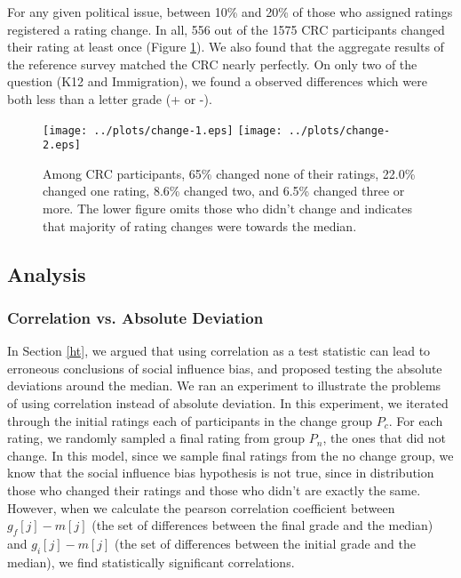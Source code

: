 For any given political issue, between 10\% and 20\% of those who assigned ratings registered a rating change.
In all, 556 out of the 1575 CRC participants changed their rating at least once (Figure \ref{change-1}).
We also found that the aggregate results of the reference survey matched the CRC nearly perfectly.
On only two of the question (K12 and Immigration), we found a observed differences which were both less than a letter grade (+ or -).

\begin{figure}[h]
\hspace*{-2em}
    \texttt{[image: ../plots/change-1.eps]}
    \hspace*{-2em}
    \texttt{[image: ../plots/change-2.eps]}
      \caption{Among CRC participants, 65\% changed none of their ratings, 22.0\% changed one rating, 8.6\% changed two, and 6.5\% changed three or more. The lower figure omits those who didn't change and indicates that majority of rating changes were towards the median.}
      \label{change-1}
\end{figure}

\subsection{Analysis}

\subsubsection{Correlation vs. Absolute Deviation}
\label{exp-robust}
In Section \ref{ht}, we argued that using correlation as a test statistic can lead to erroneous conclusions of social influence bias, and proposed testing the absolute deviations around the median.
We ran an experiment to illustrate the problems of using correlation instead of absolute deviation.
In this experiment, we iterated through the initial ratings each of participants in the change group $P_c$.
For each rating, we randomly sampled a final rating from group $P_n$, the ones that did not change.
In this model, since we sample final ratings from the no change group, we know that the social influence bias hypothesis is not true, since in distribution those who changed their ratings and those who didn't are exactly the same.
However, when we calculate the pearson correlation coefficient between $g_f[j] - m[j]$ (the set of differences between the final grade and the median) and $g_i[j] - m[j]$ (the set of differences between the initial grade and the median), we find statistically significant correlations.

